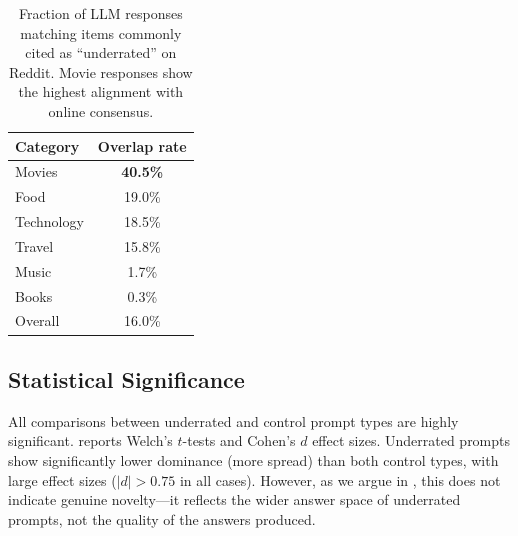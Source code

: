 \begin{table}[t]
    \centering
    \caption{Fraction of LLM responses matching items commonly cited as ``underrated'' on Reddit. Movie responses show the highest alignment with online consensus.}
    \begin{tabular}{@{}lc@{}}
        \toprule
        \textbf{Category} & \textbf{Overlap rate} \\
        \midrule
        Movies & \textbf{40.5\%} \\
        Food & 19.0\% \\
        Technology & 18.5\% \\
        Travel & 15.8\% \\
        Music & 1.7\% \\
        Books & 0.3\% \\
        \midrule
        Overall & 16.0\% \\
        \bottomrule
    \end{tabular}
    \label{tab:reddit}
\end{table}

\subsection{Statistical Significance}
\label{sec:stats}

All comparisons between underrated and control prompt types are highly significant.  reports Welch's $t$-tests and Cohen's $d$ effect sizes. Underrated prompts show significantly lower dominance (more spread) than both control types, with large effect sizes ($|d| > 0.75$ in all cases). However, as we argue in , this does not indicate genuine novelty---it reflects the wider answer space of underrated prompts, not the quality of the answers produced.

\begin{table}[t]
    \centering
    \caption{Statistical comparisons between \underrated and control prompt types. All differences are significant at $p < 0.001$ with large effect sizes.}
    \label{tab:stats}
\end{table}

